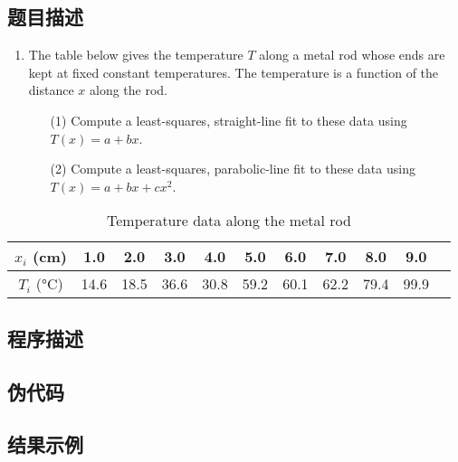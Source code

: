 \subsection{题目描述}
\begin{enumerate}
    \item The table below gives the temperature \( T \) along a metal rod whose ends are kept at fixed constant temperatures. The temperature is a function of the distance \( x \) along the rod.
    \begin{itemize}
        \item[(1)] Compute a least-squares, straight-line fit to these data using \( T(x) = a + bx \).
        \item[(2)] Compute a least-squares, parabolic-line fit to these data using \( T(x) = a + bx + cx^2 \).
    \end{itemize}
\end{enumerate}

\begin{table}[H]
    \centering
    \caption{Temperature data along the metal rod}
    \begin{tabular}{@{}ccccccccccc@{}}
        \toprule
        \(x_i\) (cm) & 1.0 & 2.0 & 3.0 & 4.0 & 5.0 & 6.0 & 7.0 & 8.0 & 9.0 \\ 
        \midrule
        \(T_i\) (°C) & 14.6 & 18.5 & 36.6 & 30.8 & 59.2 & 60.1 & 62.2 & 79.4 & 99.9 \\ 
        \bottomrule
    \end{tabular}
\end{table}

\subsection{程序描述}


\subsection{伪代码}



\subsection{结果示例}

